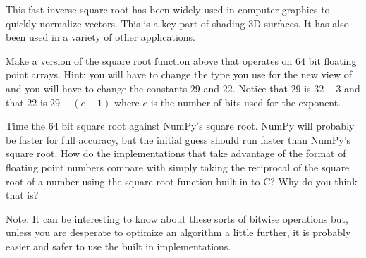 This fast inverse square root has been widely used in computer graphics to quickly normalize vectors.
This is a key part of shading 3D surfaces.
It has also been used in a variety of other applications.

\begin{problem}
Make a version of the square root function above that operates on 64 bit floating point arrays.
Hint: you will have to change the type you use for the new view of  and you will have to change the constants $29$ and $22$.
Notice that $29$ is $32-3$ and that $22$ is $29-(e-1)$ where $e$ is the number of bits used for the exponent.

Time the 64 bit square root against NumPy's square root.
NumPy will probably be faster for full accuracy, but the initial guess should run faster than NumPy's square root.
How do the implementations that take advantage of the format of floating point numbers compare with simply taking the reciprocal of the square root of a number using the square root function built in to C?
Why do you think that is?
\end{problem}

Note: It can be interesting to know about these sorts of bitwise operations but, unless you are desperate to optimize an algorithm a little further, it is probably easier and safer to use the built in implementations.